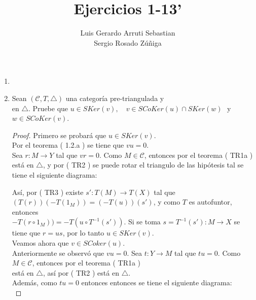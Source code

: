 \documentclass{article}
\title{Ejercicios 1-13'}
\author{Luis Gerardo Arruti Sebastian\\ Sergio Rosado Zúñiga}
\date{}
\begin{document}
	\maketitle
\begin{enumerate}

\item
\item Sean $(\mathscr{C},T,\triangle)$ una categoría pre-triangulada y  \\en $\triangle$.
Pruebe que $u\in SKer (v),\quad  v\in SCoKer(u)\cap SKer(w)$\,\, y \\ $w\in SCoKer(v)$.
\begin{proof}
Primero se probará que $u\in SKer (v)$. \\Por el teorema ( 1.2.a ) se tiene que $vu=0$.\\

Sea $r:M\to Y$ tal que $vr=0$. Como $M\in \mathscr{C}$, entonces por el teorema ( TR1a )  está en 
$\triangle$, y por ( TR2 ) se puede rotar el triangulo de las hipótesis tal se tiene el siguiente diagrama:\\

\centerline{
}

Así, por ( TR3 ) existe $s':T(M)\to T(X)$ tal que \\ $(T(r))(-T(1_M))=(-T(u))(s')$, y como $T$ es autofuntor, entonces \\
$-T(r\circ 1_M))=-T(u\circ T^{-1}(s'))$. Si se toma $s= T^{-1}(s'):M\to X$  se tiene que $r=us$, por lo tanto $u\in SKer(v)$.\\

Veamos ahora que $v\in SCoker(u)$.\\

Anteriormente se observó que $vu=0$. Sea $t:Y\to M$ tal que $tu=0$. Como $M\in \mathscr{C}$, entonces 
por el teorema ( TR1a )  \\está en $\triangle$, así por ( TR2 ) 
 está en $\triangle$.\\

Además, como $tu=0$ entonces entonces se tiene el siguiente diagrama:\\


\end{proof}
\end{enumerate}
\end{document}

